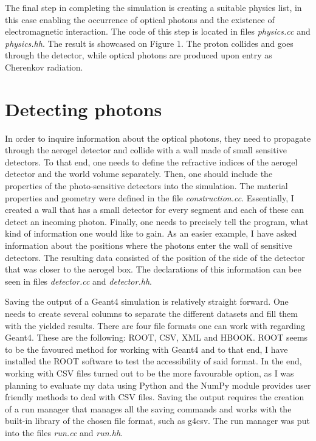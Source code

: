 \documentclass[12pt,twocolumn]{article}
\begin{document}
The final step in completing the simulation is creating a suitable physics list, in this case enabling the occurrence of optical photons and the existence of electromagnetic interaction. The code of this step is located in files \emph{physics.cc} and \emph{physics.hh}. The result is showcased on Figure 1. The proton collides and goes through the detector, while optical photons are produced upon entry as Cherenkov radiation.

\section{Detecting photons}

In order to inquire information about the optical photons, they need to propagate through the aerogel detector and collide with a wall made of small sensitive detectors. To that end, one needs to define the refractive indices of the aerogel detector and the world volume separately. Then, one should include the properties of the photo-sensitive detectors into the simulation. The material properties and geometry were defined in the file \emph{construction.cc}. Essentially, I created a wall that has a small detector for every segment and each of these can detect an incoming photon. Finally, one needs to precisely tell the program, what kind of information one would like to gain. As an easier example, I have asked information about the positions where the photons enter the wall of sensitive detectors. The resulting data consisted of the position of the side of the detector that was closer to the aerogel box. The declarations of this information can bee seen in files \emph{detector.cc} and \emph{detector.hh}.

Saving the output of a Geant4 simulation is relatively straight forward. One needs to create several columns to separate the different datasets and fill them with the yielded results. There are four file formats one can work with regarding Geant4. These are the following: ROOT, CSV, XML and HBOOK. ROOT seems to be the favoured method for working with Geant4 and to that end, I have installed the ROOT software to test the accessibility of said format. In the end, working with CSV files turned out to be the more favourable option, as I was planning to evaluate my data using Python and the NumPy module provides user friendly methods to deal with CSV files. Saving the output requires the creation of a run manager that manages all the saving commands and works with the built-in library of the chosen file format, such as g4csv. The run manager was put into the files \emph{run.cc} and \emph{run.hh}.
\end{document}
